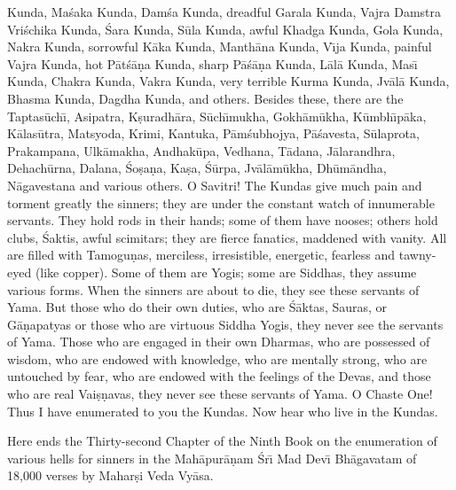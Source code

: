 Kunda, Ma\'saka Kunda, Dam\'sa Kunda, dreadful Garala Kunda, Vajra Damstra Vri\'schika Kunda, \'Sara Kunda, S\=ula Kunda, awful Khadga Kunda, Gola Kunda, Nakra Kunda, sorrowful K\=aka Kunda, Manth\=ana Kunda, V\={\i}ja Kunda, painful Vajra Kunda, hot P\=at\'s\=a\d{n}a Kunda, sharp P\=a\'s\=a\d{n}a Kunda, L\=al\=a Kunda, Mas\={\i} Kunda, Chakra Kunda, Vakra Kunda, very terrible Kurma Kunda, Jv\=al\=a Kunda, Bhasma Kunda, Dagdha Kunda, and others. Besides these, there are the Taptas\=uch\={\i}, Asipatra, K\d{s}uradh\=ara, S\=uch\={\i}mukha, Gokh\=am\=ukha, K\=umbh\={\i}p\=aka, K\=alas\=utra, Matsyoda, Krimi, Kantuka, P\=am\'subhojya, P\=a\'savesta, S\=ulaprota, Prakampana, Ulk\=amakha, Andhak\=upa, Vedhana, T\=adana, J\=alarandhra, Dehach\=urna, Dalana, \'So\d{s}a\d{n}a, Ka\d{s}a, \'S\=urpa, Jv\=al\=am\=ukha, Dh\=um\=andha, N\=agavestana and various others. O Savitri! The Kundas give much pain and torment greatly the sinners; they are under the constant watch of innumerable servants. They hold rods in their hands; some of them have nooses; others hold clubs, \'Saktis, awful scimitars; they are fierce fanatics, maddened with vanity. All are filled with Tamogu\d{n}as, merciless, irresistible, energetic, fearless and tawny-eyed (like copper). Some of them are Yogis; some are Siddhas, they assume various forms. When the sinners are about to die, they see these servants of Yama. But those who do their own duties, who are \'S\=aktas, Sauras, or G\=a\d{n}apatyas or those who are virtuous Siddha Yogis, they never see the servants of Yama. Those who are engaged in their own Dharmas, who are possessed of wisdom, who are endowed with knowledge, who are mentally strong, who are untouched by fear, who are endowed with the feelings of the Devas, and those who are real Vai\d{s}\d{n}avas, they never see these servants of Yama. O Chaste One! Thus I have enumerated to you the Kundas. Now hear who live in the Kundas.

Here ends the Thirty-second Chapter of the Ninth Book on the enumeration of various hells for sinners in the Mah\=apur\=a\d{n}am \'Sr\={\i} Mad Dev\={\i} Bh\=agavatam of 18,000 verses by Mahar\d{s}i Veda Vy\=asa.



